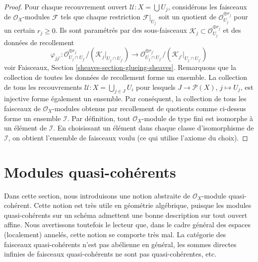 \begin{proof}
Pour chaque recouvrement ouvert $\mathcal{U} : X = \bigcup U_j$, considérons
les faisceaux de $\mathcal{O}_X$-modules $\mathcal{F}$ tels que chaque
restriction $\mathcal{F}|_{U_j}$ soit un quotient de
$\mathcal{O}_{U_j}^{\oplus r_j}$ pour un certain $r_j \geq 0$. Ils sont
paramétrés par des sous-faisceaux
$\mathcal{K}_j \subset \mathcal{O}_{U_j}^{\oplus r_j}$ et des données de
recollement
$$
\varphi_{jj'} :
\mathcal{O}_{U_j \cap U_{j'}}^{\oplus r_j}/
(\mathcal{K}_j|_{U_j \cap U_{j'}})
\longrightarrow
\mathcal{O}_{U_j \cap U_{j'}}^{\oplus r_{j'}}/
(\mathcal{K}_{j'}|_{U_j \cap U_{j'}})
$$
voir Faisceaux, Section \ref{sheaves-section-glueing-sheaves}. Remarquons que
la collection de toutes les données de recollement forme un ensemble. La
collection de tous les recouvrements
$\mathcal{U} : X = \bigcup_{j \in J} U_i$ pour lesquels
$J \to \mathcal{P}(X)$, $j \mapsto U_j$, est injective forme également un
ensemble. Par conséquent, la collection de tous les faisceaux de
$\mathcal{O}_X$-modules obtenus par recollement de quotients comme ci-dessus
forme un ensemble $\mathcal{I}$. Par définition, tout
$\mathcal{O}_X$-module de type fini est isomorphe à un élément de
$\mathcal{I}$. En choisissant un élément dans chaque classe d'isomorphisme de
$\mathcal{I}$, on obtient l'ensemble de faisceaux voulu (ce qui utilise
l'axiome du choix).
\end{proof}













\section{Modules quasi-cohérents}
\label{section-quasi-coherent}

\noindent
Dans cette section, nous introduisons une notion abstraite de
$\mathcal{O}_X$-module quasi-cohérent. Cette notion est très utile en géométrie
algébrique, puisque les modules quasi-cohérents sur un schéma admettent une
bonne description sur tout ouvert affine. Nous avertissons toutefois le
lecteur que, dans le cadre général des espaces (localement) annelés, cette
notion se comporte très mal. La catégorie des faisceaux quasi-cohérents n'est
pas abélienne en général, les sommes directes infinies de faisceaux
quasi-cohérents ne sont pas quasi-cohérentes, etc.

